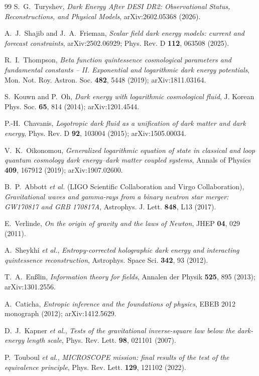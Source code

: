 \documentclass[11pt,reqno]{amsart}
\theoremstyle{plain}
\theoremstyle{definition}
\theoremstyle{remark}
\begin{document}
\begin{thebibliography}{99}
S.~G.~Turyshev,
\emph{Dark Energy After DESI DR2: Observational Status, Reconstructions, and Physical Models},
arXiv:2602.05368 (2026).

A.~J.~Shajib and J.~A.~Frieman,
\emph{Scalar field dark energy models: current and forecast constraints},
arXiv:2502.06929; Phys. Rev. D \textbf{112}, 063508 (2025).

R.~I.~Thompson,
\emph{Beta function quintessence cosmological parameters and fundamental
constants -- II. Exponential and logarithmic dark energy potentials},
Mon. Not. Roy. Astron. Soc. \textbf{482}, 5448 (2019); arXiv:1811.03164.

S.~Kouwn and P.~Oh,
\emph{Dark energy with logarithmic cosmological fluid},
J. Korean Phys. Soc. \textbf{65}, 814 (2014); arXiv:1201.4544.

P.-H.~Chavanis,
\emph{Logotropic dark fluid as a unification of dark matter and dark energy},
Phys. Rev. D \textbf{92}, 103004 (2015); arXiv:1505.00034.

V.~K.~Oikonomou,
\emph{Generalized logarithmic equation of state in classical and loop
quantum cosmology dark energy--dark matter coupled systems},
Annals of Physics \textbf{409}, 167912 (2019); arXiv:1907.02600.

B.~P.~Abbott \emph{et al.} (LIGO Scientific Collaboration and Virgo Collaboration),
\emph{Gravitational waves and gamma-rays from a binary neutron star merger:
GW170817 and GRB 170817A},
Astrophys. J. Lett. \textbf{848}, L13 (2017).

E.~Verlinde,
\emph{On the origin of gravity and the laws of Newton},
JHEP \textbf{04}, 029 (2011).

A.~Sheykhi \emph{et al.},
\emph{Entropy-corrected holographic dark energy and interacting quintessence reconstruction},
Astrophys. Space Sci. \textbf{342}, 93 (2012).

T.~A.~En{\ss}lin,
\emph{Information theory for fields},
Annalen der Physik \textbf{525}, 895 (2013); arXiv:1301.2556.

A.~Caticha,
\emph{Entropic inference and the foundations of physics},
EBEB 2012 monograph (2012); arXiv:1412.5629.

D.~J.~Kapner \emph{et al.},
\emph{Tests of the gravitational inverse-square law below the dark-energy length scale},
Phys. Rev. Lett. \textbf{98}, 021101 (2007).

P.~Touboul \emph{et al.},
\emph{MICROSCOPE mission: final results of the test of the equivalence principle},
Phys. Rev. Lett. \textbf{129}, 121102 (2022).

\end{thebibliography}
\end{document}
